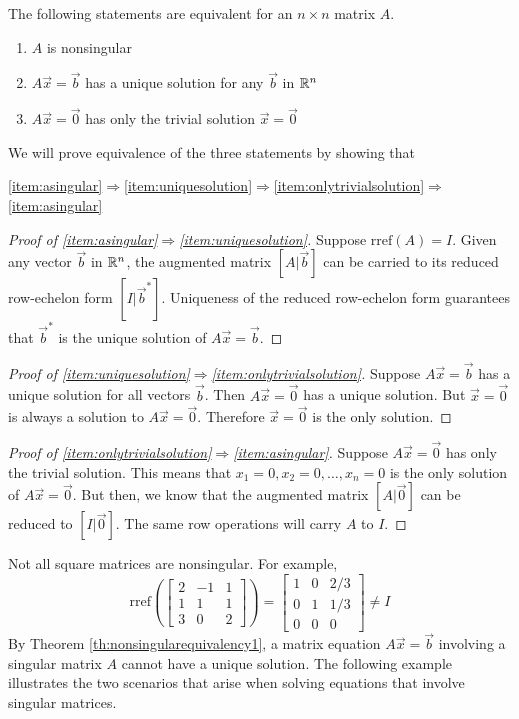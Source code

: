 \documentclass{ximera}
\begin{document}
\begin{theorem}\label{th:nonsingularequivalency1} The following statements are equivalent for an $n\times n$ matrix $A$.
\begin{enumerate}
\item\label{item:asingular} $A$ is nonsingular
\item\label{item:uniquesolution} $A\vec{x}=\vec{b}$ has a unique solution for any $\vec{b}$ in $\mathbb{R}^n$
\item\label{item:onlytrivialsolution} $A\vec{x}=\vec{0}$ has only the trivial solution $\vec{x}=\vec{0}$
\end{enumerate}
\end{theorem}
We will prove equivalence of the three statements by showing that
\begin{center}
\ref{item:asingular}$\Rightarrow$\ref{item:uniquesolution}$\Rightarrow$\ref{item:onlytrivialsolution}$\Rightarrow$\ref{item:asingular}
\end{center}
\begin{proof}[Proof of \ref{item:asingular}$\Rightarrow$\ref{item:uniquesolution}]
Suppose $\mbox{rref}(A)=I$.  Given any vector $\vec{b}$ in $\mathbb{R}^n$, the augmented matrix $[A|\vec{b}]$ can be carried to its reduced row-echelon form $[I|\vec{b}^*]$.  Uniqueness of the reduced row-echelon form guarantees that $\vec{b}^*$ is the unique solution of $A\vec{x}=\vec{b}$. 
\end{proof}
\begin{proof}[Proof of \ref{item:uniquesolution}$\Rightarrow$\ref{item:onlytrivialsolution}]
Suppose $A\vec{x}=\vec{b}$ has a unique solution for all vectors $\vec{b}$.  Then $A\vec{x}=\vec{0}$ has a unique solution.  But $\vec{x}=\vec{0}$ is always a solution to $A\vec{x}=\vec{0}$.  Therefore $\vec{x}=\vec{0}$ is the only solution.
\end{proof}
\begin{proof}[Proof of \ref{item:onlytrivialsolution}$\Rightarrow$\ref{item:asingular}]
Suppose $A\vec{x}=\vec{0}$ has only the trivial solution.  This means that $x_1=0, x_2=0,\dots ,x_n=0$ is the only solution of $A\vec{x}=\vec{0}$.  But then, we know that the augmented matrix $[A|\vec{0}]$ can be reduced to $[I|\vec{0}]$.  The same row operations will carry $A$ to $I$.
\end{proof}

Not all square matrices are nonsingular.  For example,
$$\mbox{rref}\left(\begin{bmatrix}2&-1&1\\1&1&1\\3&0&2\end{bmatrix}\right)=\begin{bmatrix}1&0&2/3\\0&1&1/3\\0&0&0\end{bmatrix}\neq I$$
By Theorem \ref{th:nonsingularequivalency1}, a matrix equation $A\vec{x}=\vec{b}$ involving a singular matrix $A$ cannot have a unique solution. The following example illustrates the two scenarios that arise when solving equations that involve singular matrices.
\end{document}
